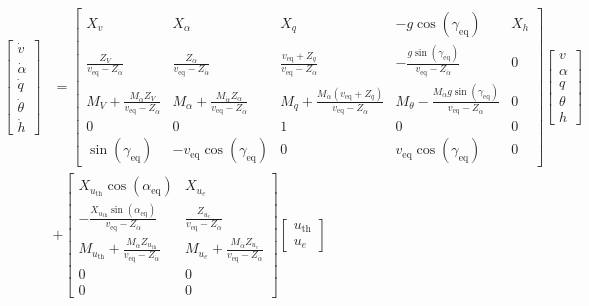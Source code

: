 \documentclass[]{../sty/aiaa-tc}
\theoremstyle{examplestyle}
\begin{document}
  \begin{equation}
    \label{eqn.longandvelocityss}
    \begin{split}
      \begin{bmatrix}
        \dot{v}_{} \\
        \dot{\alpha} \\
        \dot{q} \\
        \dot{\theta} \\
        \dot{h}
      \end{bmatrix}
      &=
      \begin{bmatrix}
        X_{v} & X_{\alpha} & X_{q} & -g\cos(\gamma_{\text{eq}}) & X_{h} \\
        \frac{Z_{V}}{v_{\text{eq}}-Z_{\dot{\alpha}}} & \frac{Z_{\alpha}}{v_{\text{eq}}-Z_{\dot{\alpha}}} & \frac{v_{\text{eq}}+Z_{q}}{v_{\text{eq}}-Z_{\dot{\alpha}}} & -\frac{g\sin({\gamma_{\text{eq}}})}{v_{\text{eq}}-Z_{\dot{\alpha}}} & 0\\
        M_{V}+\frac{M_{\dot{\alpha}}Z_{V}}{v_{\text{eq}}-Z_{\dot{\alpha}}} & M_{\alpha}+\frac{M_{\dot{\alpha}}Z_{\alpha}}{v_{\text{eq}}-Z_{\dot{\alpha}}} & M_{q}+\frac{M_{\dot{\alpha}}(v_{\text{eq}}+Z_{q})}{v_{\text{eq}}-Z_{\dot{\alpha}}} & M_{\theta}-\frac{M_{\dot{\alpha}}g\sin(\gamma_{\text{eq}})}{v_{\text{eq}}-Z_{\dot{\alpha}}} & 0 \\
        0 & 0 & 1 & 0 & 0 \\
        \sin(\gamma_{\text{eq}}) & -v_{\text{eq}}\cos(\gamma_{\text{eq}}) & 0 & v_{\text{eq}}\cos(\gamma_{\text{eq}}) & 0
      \end{bmatrix}
      \begin{bmatrix}
        v_{} \\
        \alpha \\
        q \\
        \theta \\
        h
      \end{bmatrix} \\
      &+
      \begin{bmatrix}
        X_{u_{\text{th}}}\cos(\alpha_{\text{eq}}) & X_{u_{e}} \\
        -\frac{X_{u_{\text{th}}}\sin(\alpha_{\text{eq}})}{v_{\text{eq}}-Z_{\dot{\alpha}}} & \frac{Z_{u_{e}}}{v_{\text{eq}}-Z_{\dot{\alpha}}} \\
        M_{u_{\text{th}}}+\frac{M_{\dot{\alpha}}Z_{u_{\text{th}}}}{v_{\text{eq}}-Z_{\dot{\alpha}}} & M_{u_{e}}+\frac{M_{\dot{\alpha}}Z_{u_{e}}}{v_{\text{eq}}-Z_{\dot{\alpha}}} \\
        0 & 0 \\
        0 & 0
      \end{bmatrix}
      \begin{bmatrix}
        u_{\text{th}} \\
        u_{e}
      \end{bmatrix} \\
    \end{split}
  \end{equation}
\end{document}
